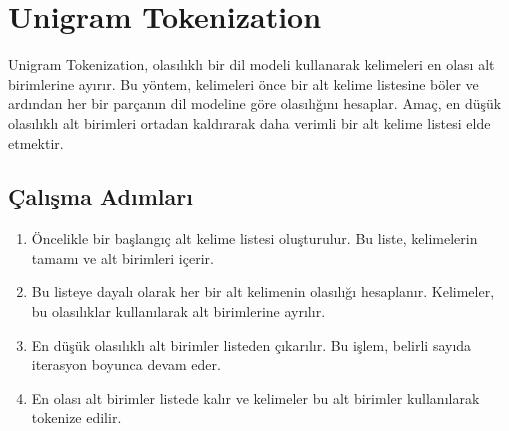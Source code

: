 \section{Unigram Tokenization}

Unigram Tokenization, olasılıklı bir dil modeli kullanarak kelimeleri en olası alt birimlerine ayırır. Bu yöntem, kelimeleri önce bir alt kelime listesine böler ve ardından her bir parçanın dil modeline göre olasılığını hesaplar. Amaç, en düşük olasılıklı alt birimleri ortadan kaldırarak daha verimli bir alt kelime listesi elde etmektir.

\subsection{Çalışma Adımları}

\begin{enumerate}
    \item Öncelikle bir başlangıç alt kelime listesi oluşturulur. Bu liste, kelimelerin tamamı ve alt birimleri içerir.
    \item Bu listeye dayalı olarak her bir alt kelimenin olasılığı hesaplanır. Kelimeler, bu olasılıklar kullanılarak alt birimlerine ayrılır.
    \item En düşük olasılıklı alt birimler listeden çıkarılır. Bu işlem, belirli sayıda iterasyon boyunca devam eder.
    \item En olası alt birimler listede kalır ve kelimeler bu alt birimler kullanılarak tokenize edilir.
\end{enumerate}

\newpage